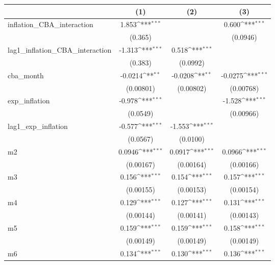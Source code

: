 {
\def\sym#1{\ifmmode^{#1}\else\(^{#1}\)\fi}
\begin{tabular}{l*{3}{c}}
\hline\hline
            &\multicolumn{1}{c}{(1)}         &\multicolumn{1}{c}{(2)}         &\multicolumn{1}{c}{(3)}         \\
\hline
inflation\_CBA\_interaction&       1.853\sym{***}&                     &       0.600\sym{***}\\
            &     (0.365)         &                     &    (0.0946)         \\
lag1\_inflation\_CBA\_interaction&      -1.313\sym{***}&       0.518\sym{***}&                     \\
            &     (0.383)         &    (0.0992)         &                     \\
cba\_month   &     -0.0214\sym{**} &     -0.0208\sym{**} &     -0.0275\sym{***}\\
            &   (0.00801)         &   (0.00802)         &   (0.00768)         \\
exp\_inflation&      -0.978\sym{***}&                     &      -1.528\sym{***}\\
            &    (0.0549)         &                     &   (0.00966)         \\
lag1\_exp\_inflation&      -0.577\sym{***}&      -1.553\sym{***}&                     \\
            &    (0.0567)         &    (0.0100)         &                     \\
m2          &      0.0946\sym{***}&      0.0917\sym{***}&      0.0966\sym{***}\\
            &   (0.00167)         &   (0.00164)         &   (0.00166)         \\
m3          &       0.156\sym{***}&       0.154\sym{***}&       0.157\sym{***}\\
            &   (0.00155)         &   (0.00153)         &   (0.00154)         \\
m4          &       0.129\sym{***}&       0.127\sym{***}&       0.131\sym{***}\\
            &   (0.00144)         &   (0.00141)         &   (0.00143)         \\
m5          &       0.159\sym{***}&       0.159\sym{***}&       0.158\sym{***}\\
            &   (0.00149)         &   (0.00149)         &   (0.00149)         \\
m6          &       0.134\sym{***}&       0.130\sym{***}&       0.136\sym{***}\\

\end{tabular}}
